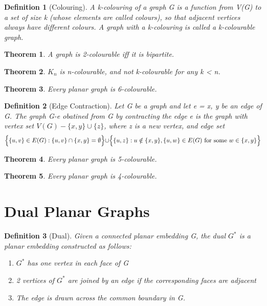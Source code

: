 \documentclass[11pt, oneside]{book}
\theoremstyle{break}
\newtheorem{thm}{Theorem}[section]
\newtheorem{defn}{Definition}[section]
\begin{document}
\begin{defn}[Colouring]
	A k-colouring of a graph G is a function from V(G) to a set of size k (whose elements are called colours), so that adjacent vertices always have different colours. A graph with a k-colouring is called a k-colourable graph.
\end{defn}

\begin{thm}
	A graph is 2-colourable iff it is bipartite.
\end{thm}

\begin{thm}
	$K_n$ is n-colourable, and not k-colourable for any k < n.
\end{thm}

\begin{thm}
	Every planar graph is 6-colourable.
\end{thm}

\begin{defn}[Edge Contraction]
	Let G be a graph and let e = {x, y} be an edge of G. The graph G-e obatined from G by contracting the edge e is the graph with vertex set $V(G) - \{x, y\} \cup \{z\}$, where z is a new vertex, and edge set
	\[
		\Bigr\{\{u, v\} \in E(G) : \{u, v\}\cap\{x, y\}=\emptyset\Bigl\}\cup\Bigr\{\{u, z\}:u\notin\{x,y\},\{u, w\}\in E(G) \text{ for some } w\in\{x, y\}\Bigl\}
	\]
\end{defn}

\begin{thm}
	Every planar graph is 5-colourable.
\end{thm}

\begin{thm}
	Every planar graph is 4-colourable.
\end{thm}


\section{Dual Planar Graphs}

\begin{defn}[Dual]
	Given a connected planar embedding G, the dual $G^*$ is a planar embedding constructed as follows:\\
	\begin{enumerate}
		\item $G^*$ has one vertex in each face of G
		\item 2 vertices of $G^*$ are joined by an edge if the corresponding faces are adjacent
		\item The edge is drawn across the common boundary in G.
	\end{enumerate}
\end{defn}
\end{document}
